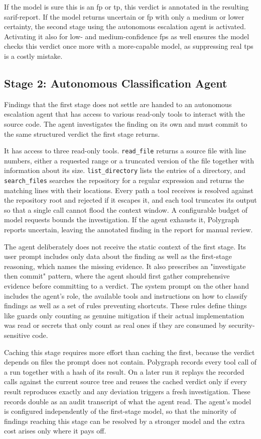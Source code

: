 If the model is sure this is an \ac{fp} or \ac{tp}, this verdict is annotated in the resulting \ac{sarif}-report. If the model returns uncertain or \ac{fp} with only a medium or lower certainty, the second stage using the autonomous escalation agent is activated. Activating it also for low- and medium-confidence \acp{fp} as well ensures the model checks this verdict once more with a more-capable model, as suppressing real \acp{tp} is a costly mistake.

\subsection{Stage 2: Autonomous Classification Agent}

Findings that the first stage does not settle are handed to an autonomous
escalation agent that has access to various read-only tools to interact with the source code.
The agent investigates the finding on its own and must commit to the same
structured verdict the first stage returns.

It has access to three read-only tools. \texttt{read\_file} returns a source file with
line numbers, either a requested range or a truncated version of the file
together with information about its size. \texttt{list\_directory} lists the
entries of a directory, and \texttt{search\_files} searches the repository for a
regular expression and returns the matching lines with their locations. Every path
a tool receives is resolved against the repository root and rejected if it escapes it, and each
tool truncates its output so that a single call cannot flood the context
window. A configurable budget of model requests bounds the investigation. If the agent exhausts it, Polygraph reports uncertain, leaving the annotated finding in the report for manual review.

The agent deliberately does not receive the static context of the first stage.
Its user prompt includes only data about the finding as well as the first-stage reasoning, which
names the missing evidence. It also prescribes an "investigate then commit" pattern, where the agent should first gather comprehensive evidence before committing to a verdict.
The system prompt on the other hand includes the agent's role, the available tools and instructions on how to classify findings as well as a set of rules preventing shortcuts. These rules define things like guards only counting as genuine mitigation if their actual implementation was read or secrets that only count as real ones if they are consumed by security-sensitive code.

Caching this stage requires more effort than caching the first, because the
verdict depends on files the prompt does not contain. Polygraph records every
tool call of a run together with a hash of its result. On a later run it replays
the recorded calls against the current source tree and reuses the cached verdict
only if every result reproduces exactly and any deviation triggers a fresh
investigation. These records double as an audit transcript of what the agent
read. The agent's model is configured independently of the first-stage model, so
that the minority of findings reaching this stage can be resolved by a stronger
model and the extra cost arises only where it pays off.
